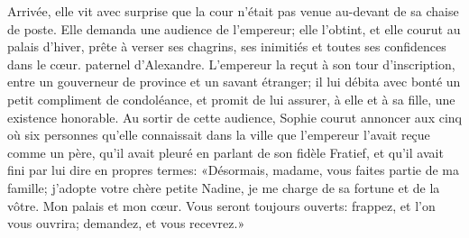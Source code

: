 Arrivée, elle vit avec surprise que la cour n'était pas venue au-devant
de sa chaise de poste. Elle demanda une audience de l'empereur; elle
l'obtint, et elle courut au palais d'hiver, prête à verser ses chagrins,
ses inimitiés et toutes ses confidences dans le cœur. paternel
d'Alexandre. L'empereur la reçut à son tour d'inscription, entre un
gouverneur de province et un savant étranger; il lui débita avec bonté
un petit compliment de condoléance, et promit de lui assurer, à elle et
à sa fille, une existence honorable. Au sortir de cette audience, Sophie
courut annoncer aux cinq où six personnes qu'elle connaissait dans la
ville que l'empereur l'avait reçue comme un père, qu'il avait pleuré en
parlant de son fidèle Fratief, et qu'il avait fini par lui dire en
propres termes: «Désormais, madame, vous faites partie de ma famille;
j'adopte votre chère petite Nadine, je me charge de sa fortune et de la
vôtre. Mon palais et mon cœur. Vous seront toujours ouverts: frappez, et
l'on vous ouvrira; demandez, et vous recevrez.»

